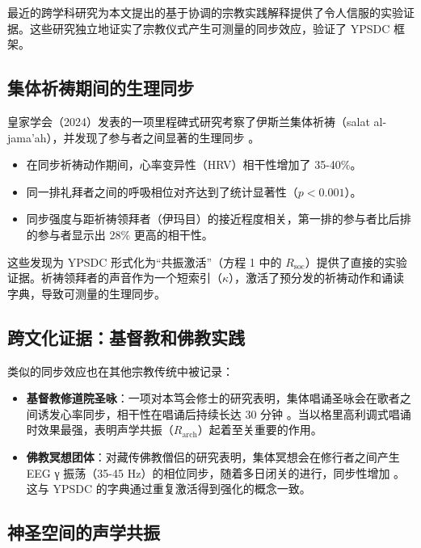 \documentclass[12pt,a4paper]{article}
\begin{document}
	最近的跨学科研究为本文提出的基于协调的宗教实践解释提供了令人信服的实验证据。这些研究独立地证实了宗教仪式产生可测量的同步效应，验证了 YPSDC 框架。
	
	\subsection{集体祈祷期间的生理同步}
	
	皇家学会（2024）发表的一项里程碑式研究考察了伊斯兰集体祈祷（salat al-jama'ah），并发现了参与者之间显著的生理同步 \cite{RoyalSociety2024}。
	\begin{itemize}
		\item 在同步祈祷动作期间，心率变异性（HRV）相干性增加了 35-40\%。
		\item 同一排礼拜者之间的呼吸相位对齐达到了统计显著性（$p < 0.001$）。
		\item 同步强度与距祈祷领拜者（伊玛目）的接近程度相关，第一排的参与者比后排的参与者显示出 28\% 更高的相干性。
	\end{itemize}
	
	这些发现为 YPSDC 形式化为“共振激活”（方程 1 中的 $R_{\mathrm{soc}}$）提供了直接的实验证据。祈祷领拜者的声音作为一个短索引（$\kappa$），激活了预分发的祈祷动作和诵读字典，导致可测量的生理同步。
	
	\subsection{跨文化证据：基督教和佛教实践}
	
	类似的同步效应也在其他宗教传统中被记录：
	
	\begin{itemize}
		\item \textbf{基督教修道院圣咏}：一项对本笃会修士的研究表明，集体唱诵圣咏会在歌者之间诱发心率同步，相干性在唱诵后持续长达 30 分钟 \cite{Craswell2023}。当以格里高利调式唱诵时效果最强，表明声学共振（$R_{\mathrm{arch}}$）起着至关重要的作用。
		
		\item \textbf{佛教冥想团体}：对藏传佛教僧侣的研究表明，集体冥想会在修行者之间产生 EEG γ 振荡（35-45 Hz）的相位同步，随着多日闭关的进行，同步性增加 \cite{Lutz2017}。这与 YPSDC 的字典通过重复激活得到强化的概念一致。
	\end{itemize}
	
	\subsection{神圣空间的声学共振}
	
\end{document}
